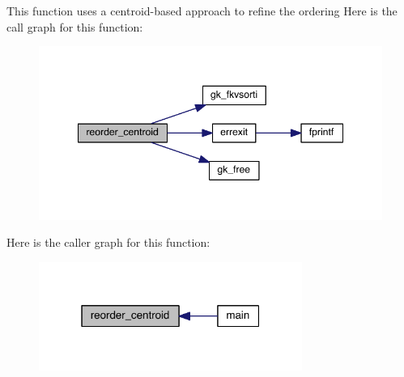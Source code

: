 This function uses a centroid-\/based approach to refine the ordering Here is the call graph for this function\+:\nopagebreak
\begin{figure}[H]
\begin{center}
\leavevmode
\includegraphics[width=348pt]{a00149_a1a7121f82ee758732f18aedf847fe88a_cgraph}
\end{center}
\end{figure}
Here is the caller graph for this function\+:\nopagebreak
\begin{figure}[H]
\begin{center}
\leavevmode
\includegraphics[width=244pt]{a00149_a1a7121f82ee758732f18aedf847fe88a_icgraph}
\end{center}
\end{figure}

